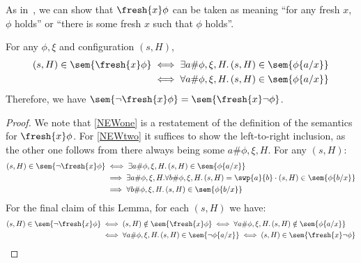 As in~\cite{PittsGabbay,Pitts}, we can show that $\fresh{x}\phi$ can be taken as meaning ``for any fresh $x$, $\phi$ holds'' or ``there is some fresh $x$ such that $\phi$ holds''. 

\begin{lemma}
  For any $\phi,\xi$ and configuration $(s,H)$,
  \begin{align}
    (s,H)\in\sem{\fresh{x}\phi} 
    \iff \exists a\#\phi,\xi,H.\,(s,H)\in\sem{\phi\{a/x\}}\label{NEWone}\\
\iff \forall a\#\phi,\xi,H.\,(s,H)\in\sem{\phi\{a/x\}}\label{NEWtwo}
  \end{align}
Therefore, we have $\sem{\lnot\fresh{x}\phi}=\sem{\fresh{x}\lnot\phi}$.
\end{lemma}
\begin{proof}
  We note that \eqref{NEWone} is a restatement of the definition of the semantics for $\fresh{x}\phi$. For \eqref{NEWtwo}
it suffices to show the left-to-right inclusion, as the other one follows from there always being some $a\#\phi,\xi,H$.
  For any $(s,H)$:
  \begin{align*}
(s,H)\in\sem{\lnot\fresh{x}\phi} &
\iff\exists a\#\phi,\xi,H.\,(s,H)\in\sem{\phi\{a/x\}}\\
&\implies\exists a\#\phi,\xi,H.\forall b\#\phi,\xi,H.\,(s,H)=\swp{a}{b}\cdot(s,H)\in\sem{\phi\{b/x\}}\\
 &\implies \forall b\#\phi,\xi,H.\,(s,H)\in\sem{\phi\{b/x\}}
  \end{align*}
  For the final claim of this Lemma, for each $(s,H)$ we have:
    \begin{align*}
    (s,H)\in\sem{\lnot\fresh{x}\phi} &
    \iff (s,H)\notin\sem{\fresh{x}\phi} 
\iff\forall a\#\phi,\xi,H.\,(s,H)\notin\sem{\phi\{a/x\}}\\
&\iff\forall a\#\phi,\xi,H.\,(s,H)\in\sem{\lnot\phi\{a/x\}}
\iff (s,H)\in\sem{\fresh{x}\lnot\phi}
  \end{align*}
\end{proof}

